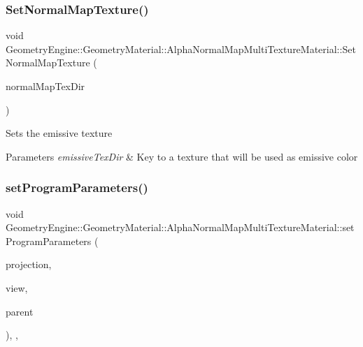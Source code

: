 \subsubsection{\texorpdfstring{SetNormalMapTexture()}{SetNormalMapTexture()}}
{\footnotesize\ttfamily void Geometry\+Engine\+::\+Geometry\+Material\+::\+Alpha\+Normal\+Map\+Multi\+Texture\+Material\+::\+Set\+Normal\+Map\+Texture (\begin{DoxyParamCaption}\item[{const std\+::string \&}]{normal\+Map\+Tex\+Dir }\end{DoxyParamCaption})}

Sets the emissive texture 
\begin{DoxyParams}{Parameters}
{\em emissive\+Tex\+Dir} & Key to a texture that will be used as emissive color \\
\hline
\end{DoxyParams}
\mbox{\label{class_geometry_engine_1_1_geometry_material_1_1_alpha_normal_map_multi_texture_material_a38d93e639375db048fc688c4a9848029}} 
\subsubsection{\texorpdfstring{setProgramParameters()}{setProgramParameters()}}
{\footnotesize\ttfamily void Geometry\+Engine\+::\+Geometry\+Material\+::\+Alpha\+Normal\+Map\+Multi\+Texture\+Material\+::set\+Program\+Parameters (\begin{DoxyParamCaption}\item[{const Q\+Matrix4x4 \&}]{projection,  }\item[{const Q\+Matrix4x4 \&}]{view,  }\item[{const \mbox{\hyperlink{class_geometry_engine_1_1_geometry_world_item_1_1_geometry_item_1_1_geometry_item}{Geometry\+World\+Item\+::\+Geometry\+Item\+::\+Geometry\+Item}} \&}]{parent }\end{DoxyParamCaption})\hspace{0.3cm}{\ttfamily [override]}, {\ttfamily [protected]}, {\ttfamily [virtual]}}

